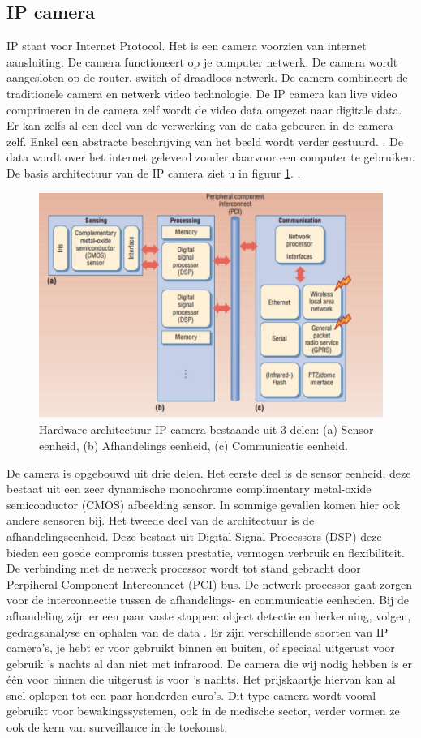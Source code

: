 \subsection{IP camera}
\label{refIPC}
IP staat voor Internet Protocol. Het is een camera voorzien van internet aansluiting. De camera functioneert op je computer netwerk. De camera wordt aangesloten op de router, switch of draadloos netwerk.  De camera combineert de traditionele camera en netwerk video technologie. De IP camera kan live video comprimeren in de camera zelf wordt de video data omgezet naar digitale data. Er kan zelfs al een deel van de verwerking van de data gebeuren in de camera zelf. Enkel een abstracte beschrijving van het beeld wordt verder gestuurd. \cite{bibIPC3}.  De data wordt over het internet geleverd zonder daarvoor een computer te gebruiken. De basis architectuur van de IP camera ziet u in figuur \ref{imgIPC}. \cite{bibVTC2}.
\begin{figure}[hbp]
	\includegraphics[scale=0.55]{ArchitectuurIPCamera}
	\caption{Hardware architectuur IP camera bestaande uit 3 delen: (a) Sensor eenheid, (b) Afhandelings eenheid, (c) Communicatie eenheid.}
	\label{imgIPC}
\end{figure}
De camera is opgebouwd uit drie delen. Het eerste deel is de sensor eenheid, deze bestaat uit een zeer dynamische monochrome complimentary metal-oxide semiconductor (CMOS) afbeelding sensor. In sommige gevallen komen hier ook andere sensoren bij. Het tweede deel van de architectuur is de afhandelingseenheid. Deze bestaat uit Digital Signal Processors (DSP) deze bieden een goede compromis tussen prestatie, vermogen verbruik en flexibiliteit.  De verbinding met de netwerk processor wordt tot stand gebracht door Perpiheral Component Interconnect (PCI) bus. De netwerk processor gaat zorgen voor de interconnectie tussen de afhandelings- en communicatie eenheden. Bij de afhandeling zijn er een paar vaste stappen: object detectie en herkenning, volgen, gedragsanalyse en ophalen van de data \cite{bibIPC2}. Er zijn verschillende soorten van IP camera's, je hebt er voor gebruikt binnen en buiten, of speciaal uitgerust voor gebruik 's nachts al dan niet met infrarood. De camera die wij nodig hebben is er \'e\'en voor binnen die uitgerust is voor 's nachts. Het prijskaartje hiervan kan al snel oplopen tot een paar honderden euro's. Dit type camera wordt vooral gebruikt voor bewakingssystemen, ook in de medische sector, verder vormen ze ook de kern van surveillance in de toekomst.


